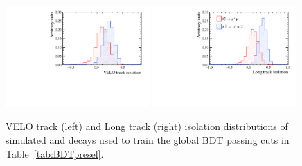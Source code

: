 
\begin{figure}[htbp]
    \centering
        \includegraphics[width=0.49\textwidth]{./Figs/Selection/iso_vel_Mar.pdf}
              \includegraphics[width=0.49\textwidth]{./Figs/Selection/long_track_Mar.pdf}
           \caption{VELO track (left) and Long track (right) isolation distributions of simulated \bsmumu and \bbbarmumux decays used to train the global BDT passing cuts in Table~\ref{tab:BDTpresel}.}
    \label{fig:Isolations}
\end{figure}

